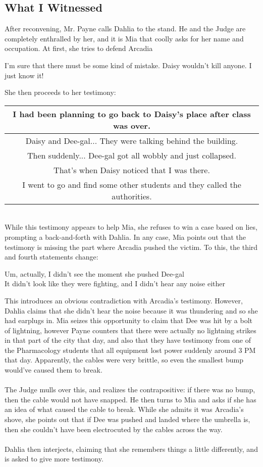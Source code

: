 \subsection{What I Witnessed}
After reconvening, Mr. Payne calls Dahlia to the stand. He and the Judge are completely enthralled by her, and it is Mia that coolly asks for her name and occupation. At first, she tries to defend Arcadia
\begin{center}
I'm sure that there must be some kind of mistake. Daisy wouldn't kill anyone. I just know it!
\end{center}
She then proceeds to her testimony:\\
\begin{tabular}{c}
I had been planning to go back to Daisy's place after class was over. \\\hline
Daisy and Dee-gal... They were talking behind the building. \\\hline
Then suddenly... Dee-gal got all wobbly and just collapsed. \\\hline
That's when Daisy noticed that I was there. \\\hline
I went to go and find some other students and they called the authorities. \\\hline
\end{tabular}\\

While this testimony appears to help Mia, she refuses to win a case based on lies, prompting a back-and-forth with Dahlia. In any case, Mia points out that the testimony is missing the part where Arcadia pushed the victim. To this, the third and fourth statements change:
\begin{center}
Um, actually, I didn't see the moment she pushed Dee-gal\\
It didn't look like they were fighting, and I didn't hear any noise either
\end{center}

This introduces an obvious contradiction with Arcadia's testimony. However, Dahlia claims that she didn't hear the noise because it was thundering and so she had earplugs in. Mia seizes this opportunity to claim that Dee was hit by a bolt of lightning, however Payne counters that there were actually no lightning strikes in that part of the city that day, and also that they have testimony from one of the Pharmacology students that all equipment lost power suddenly around 3 PM that day. Apparently, the cables were very brittle, so even the smallest bump would've caused them to break. \\
\\
The Judge mulls over this, and realizes the contrapositive: if there was no bump, then the cable would not have snapped. He then turns to Mia and asks if she has an idea of what caused the cable to break. While she admits it was Arcadia's shove, she points out that if Dee was pushed and landed where the umbrella is, then she couldn't have been electrocuted by the cables across the way. \\
\\
Dahlia then interjects, claiming that she remembers things a little differently, and is asked to give more testimony.

